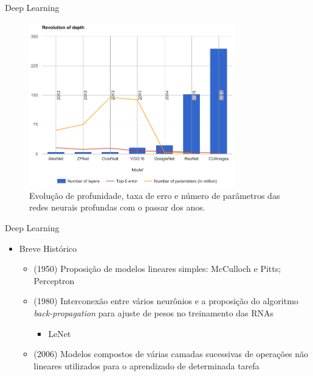 \begin{frame}{Deep Learning}
   \ \  \\[0.1cm]
   \begin{figure}[ht]
   	\centering
   	\caption{Evolução de profunidade, taxa de erro e número de parâmetros das redes neurais profundas com o passar dos anos.}
   	\label{fig:compara_redes}
   	\includegraphics[width=0.8\textwidth]{img/compara_redes.png}
   \end{figure}
\end{frame}

\begin{frame}{Deep Learning}
   \ \  \\[0.1cm]
   \begin{itemize}
     \item Breve Histórico
     \begin{itemize}
       \item (1950) Proposição de modelos lineares simples: McCulloch e Pitts; Perceptron
       \item (1980) Interconexão entre vários neurônios e a proposição do algoritmo \emph{back-propagation} para ajuste de pesos no treinamento das RNAs
       \begin{itemize}
         \item LeNet
       \end{itemize}
       \item (2006) Modelos compostos de várias camadas sucessivas de operações não lineares utilizados para o aprendizado de determinada tarefa
     \end{itemize}
   \end{itemize}
\end{frame}

